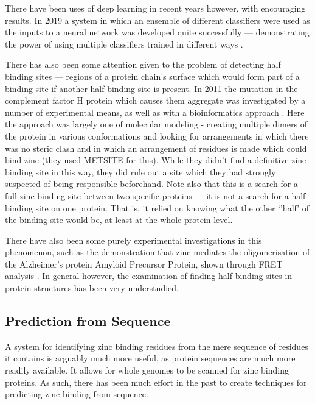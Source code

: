 There have been uses of deep learning in recent years however, with encouraging results. In 2019 a system in which an ensemble of different classifiers were used as the inputs to a neural network was developed quite successfully --- demonstrating the power of using multiple classifiers trained in different ways \cite{li2019}.


There has also been some attention given to the problem of detecting half binding sites --- regions of a protein chain's surface which would form part of a binding site if another half binding site is present. In 2011 the mutation in the complement factor H protein which causes them aggregate was investigated by a number of experimental means, as well as with a bioinformatics approach \cite{nan2011zinc}. Here the approach was largely one of molecular modeling - creating multiple dimers of the protein in various conformations and looking for arrangements in which there was no steric clash and in which an arrangement of residues is made which could bind zinc (they used METSITE for this). While they didn't find a definitive zinc binding site in this way, they did rule out a site which they had strongly suspected of being responsible beforehand. Note also that this is a search for a full zinc binding site between two specific proteins --- it is not a search for a half binding site on one protein. That is, it relied on knowing what the other `'half' of the binding site would be, at least at the whole protein level.

There have also been some purely experimental investigations in this phenomenon, such as the demonstration that zinc mediates the oligomerisation of the Alzheimer's protein Amyloid Precursor Protein, shown through FRET analysis \cite{mayer2014novel}. In general however, the examination of finding half binding sites in protein structures has been very understudied.

\subsection{Prediction from Sequence}

A system for identifying zinc binding residues from the mere sequence of residues it contains is arguably much more useful, as protein sequences are much more readily available. It allows for whole genomes to be scanned for zinc binding proteins. As such, there has been much effort in the past to create techniques for predicting zinc binding from sequence.

